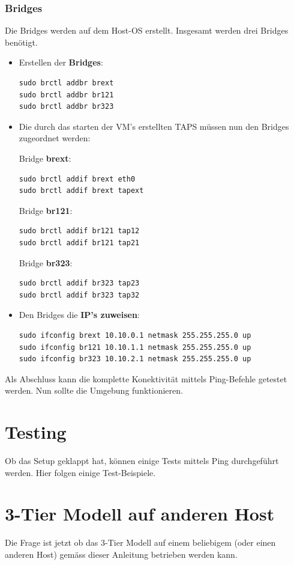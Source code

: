 \documentclass[a4,12pt]{scrartcl}
\begin{document}
\subsubsection{Bridges}
Die Bridges werden auf dem Host-OS erstellt. Insgesamt werden drei Bridges benötigt. 
\begin{itemize}
\item Erstellen der \textbf{Bridges}:
\begin{lstlisting}
sudo brctl addbr brext
sudo brctl addbr br121
sudo brctl addbr br323
\end{lstlisting}

\item Die durch das starten der VM's erstellten TAPS müssen nun den Bridges zugeordnet werden:
\newline

Bridge \textbf{brext}:
\begin{lstlisting}
sudo brctl addif brext eth0
sudo brctl addif brext tapext
\end{lstlisting}

Bridge \textbf{br121}:
\begin{lstlisting}
sudo brctl addif br121 tap12
sudo brctl addif br121 tap21
\end{lstlisting}

Bridge \textbf{br323}:
\begin{lstlisting}
sudo brctl addif br323 tap23
sudo brctl addif br323 tap32
\end{lstlisting}


\item Den Bridges die \textbf{IP's zuweisen}:
\begin{lstlisting}
sudo ifconfig brext 10.10.0.1 netmask 255.255.255.0 up
sudo ifconfig br121 10.10.1.1 netmask 255.255.255.0 up
sudo ifconfig br323 10.10.2.1 netmask 255.255.255.0 up
\end{lstlisting}
\end{itemize}
Als Abschluss kann die komplette Konektivität mittels Ping-Befehle getestet werden. Nun sollte die Umgebung funktionieren. 
\newpage

\section{Testing}
Ob das Setup geklappt hat, können einige Tests mittels Ping durchgeführt werden. Hier folgen einige Test-Beispiele. 
\newpage

\section{3-Tier Modell auf anderen Host}
Die Frage ist jetzt ob das 3-Tier Modell auf einem beliebigem (oder einen anderen Host) gemäss dieser Anleitung betrieben werden kann. 
\end{document}
